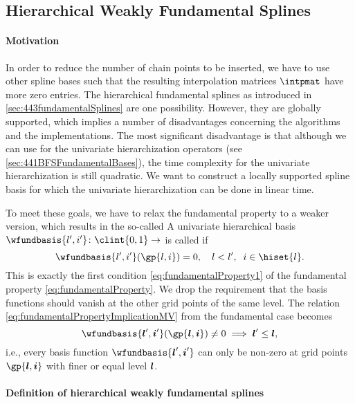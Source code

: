 \subsection{Hierarchical Weakly Fundamental Splines}
\label{sec:454wfs}

\paragraph{Motivation}

In order to reduce the number of chain points to be inserted,
we have to use other spline bases such that
the resulting interpolation matrices $\intpmat$ have more zero entries.
The hierarchical fundamental splines
as introduced in \cref{sec:443fundamentalSplines} are one possibility.
However, they are globally supported, which implies a number
of disadvantages concerning the algorithms and the implementations.
The most significant disadvantage is that although
we can use \bfs for the univariate hierarchization operators
(see \cref{sec:441BFSFundamentalBases}),
the time complexity for the univariate hierarchization is still quadratic.
We want to construct a locally supported spline basis for which
the univariate hierarchization can be done in linear time.

To meet these goals, we have to relax the fundamental property
to a weaker version, which results in the so-called
A univariate hierarchical basis
$\wfundbasis{l',i'}\colon \clint{0, 1} \to \real$
is called  if
\begin{equation}
  \label{eq:weaklyFundamentalProperty}
  \wfundbasis{l',i'}(\gp{l,i}) = 0,\quad
  l < l',\;\;
  i \in \hiset{l}.
\end{equation}
This is exactly the first condition \eqref{eq:fundamentalProperty1}
of the fundamental property \eqref{eq:fundamentalProperty}.
We drop the requirement that the basis functions
should vanish at the other grid points of the same level.
The relation \eqref{eq:fundamentalPropertyImplicationMV} from the
fundamental case becomes
\begin{equation}
  \label{eq:weaklyFundamentalPropertyImplicationMV}
  \wfundbasis{\*l',\*i'}(\gp{\*l,\*i})
  \not= 0
  \implies
  \*l' \le \*l,
\end{equation}
i.e., every basis function $\wfundbasis{\*l',\*i'}$
can only be non-zero at grid points $\gp{\*l,\*i}$ with
finer or equal level ${\boldsymbol{l}}$.

\paragraph{Definition of hierarchical weakly fundamental splines}

